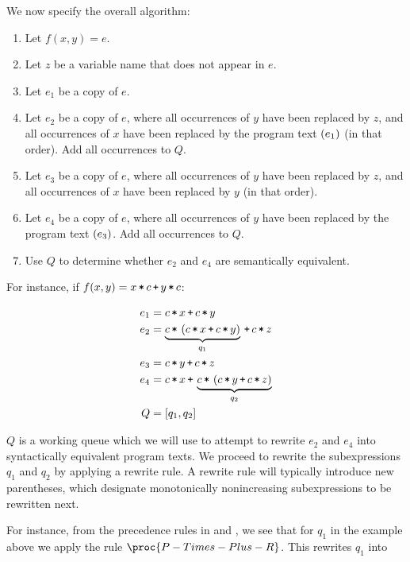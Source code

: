 We now specify the overall algorithm:

\begin{enumerate}

\item Let $f(x,y)=e$.

\item Let $z$ be a variable name that does not appear in $e$.

\item Let $e_1$ be a copy of $e$.

\item Let $e_2$ be a copy of $e$, where all occurrences of $y$ have been
replaced by $z$, and all occurrences of $x$ have been replaced by the program
text $\left({e_1}\right)$ (in that order). Add all occurrences to $Q$.

\item Let $e_3$ be a copy of $e$, where all occurrences of $y$ have been
replaced by $z$, and all occurrences of $x$ have been replaced by $y$ (in that
order).

\item Let $e_4$ be a copy of $e$, where all occurrences of $y$ have been
replaced by the program text $\left({e_3}\right)$. Add all occurrences to $Q$.

\item Use $Q$ to determine whether $e_2$ and $e_4$ are semantically equivalent.

\end{enumerate}

For instance, if $f(x,y)=x\lt c \lp y\lt c$:

\begin{align*}
e_1 &= c\lt x \lp c\lt y \\
e_2 &= \underbrace{c \lt \p{c\lt x \lp c\lt y}}_{q_1} \lp c \lt z \\
e_3 &= c\lt y \lp c \lt z \\
e_4 &= c \lt x \lp \underbrace{c \lt \p{ c \lt y \lp c \lt z }}_{q_2} \\
Q &= \seq{q_1, q_2 }
\end{align*}

$Q$ is a working queue which we will use to attempt to rewrite $e_2$ and $e_4$
into syntactically equivalent program texts. We proceed to rewrite the
subexpressions $q_1$ and $q_2$ by applying a rewrite rule. A rewrite rule will
typically introduce new parentheses, which designate monotonically
nonincreasing subexpressions to be rewritten next.

For instance, from the precedence rules in  and
, we see that for $q_1$ in the example above
we apply the rule $\proc{P-Times-Plus-R}$. This rewrites $q_1$ into

